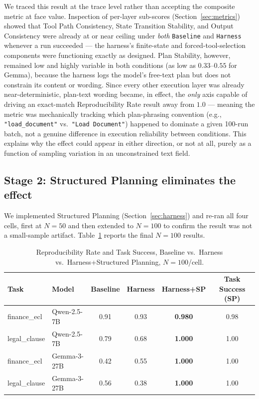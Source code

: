 \documentclass[11pt]{article}
\begin{document}
We traced this result at the trace level rather than accepting the composite metric at face value. Inspection of per-layer sub-scores (Section~\ref{sec:metrics}) showed that Tool Path Consistency, State Transition Stability, and Output Consistency were already at or near ceiling under \emph{both} \texttt{Baseline} and \texttt{Harness} whenever a run succeeded --- the harness's finite-state and forced-tool-selection components were functioning exactly as designed. Plan Stability, however, remained low and highly variable in both conditions (as low as $0.33$--$0.55$ for Gemma), because the harness logs the model's free-text plan but does not constrain its content or wording. Since every other execution layer was already near-deterministic, plan-text wording became, in effect, the \emph{only} axis capable of driving an exact-match Reproducibility Rate result away from $1.0$ --- meaning the metric was mechanically tracking which plan-phrasing convention (e.g., \texttt{"load\_document"} vs.\ \texttt{"Load Document"}) happened to dominate a given 100-run batch, not a genuine difference in execution reliability between conditions. This explains why the effect could appear in either direction, or not at all, purely as a function of sampling variation in an unconstrained text field.

\subsection{Stage 2: Structured Planning eliminates the effect}
\label{sec:n100}

We implemented Structured Planning (Section~\ref{sec:harness}) and re-ran all four cells, first at $N=50$ and then extended to $N=100$ to confirm the result was not a small-sample artifact. Table~\ref{tab:stage2} reports the final $N=100$ results.

\begin{table}[h]
\centering
\caption{Reproducibility Rate and Task Success, Baseline vs.\ Harness vs.\ Harness+Structured Planning, $N=100$/cell.}
\label{tab:stage2}
\begin{tabular}{@{}llcccc@{}}
\toprule
Task & Model & Baseline & Harness & \textbf{Harness+SP} & Task Success (SP) \\
\midrule
finance\_ecl & Qwen-2.5-7B & 0.91 & 0.93 & \textbf{0.980} & 0.98 \\
legal\_clause & Qwen-2.5-7B & 0.79 & 0.68 & \textbf{1.000} & 1.00 \\
finance\_ecl & Gemma-3-27B & 0.42 & 0.55 & \textbf{1.000} & 1.00 \\
legal\_clause & Gemma-3-27B & 0.56 & 0.38 & \textbf{1.000} & 1.00 \\
\bottomrule
\end{tabular}
\end{table}
\end{document}
